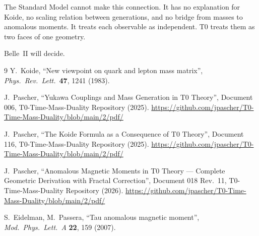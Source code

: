 The Standard Model cannot make this connection. It has no explanation for Koide, no scaling relation between generations, and no bridge from masses to anomalous moments. It treats each observable as independent. T0 treats them as two faces of one geometry.

Belle~II will decide.

\begin{thebibliography}{9}
	 Y.~Koide, ``New viewpoint on quark and lepton mass matrix'', 
	\textit{Phys.\ Rev.\ Lett.}\ \textbf{47}, 1241 (1983).
	
	 J.~Pascher, ``Yukawa Couplings and Mass Generation in T0 Theory'', 
	Document 006, T0-Time-Mass-Duality Repository (2025).
	\url{https://github.com/jpascher/T0-Time-Mass-Duality/blob/main/2/pdf/}
	
	 J.~Pascher, ``The Koide Formula as a Consequence of T0 Theory'', 
	Document 116, T0-Time-Mass-Duality Repository (2025).
	\url{https://github.com/jpascher/T0-Time-Mass-Duality/blob/main/2/pdf/}
	
	 J.~Pascher, ``Anomalous Magnetic Moments in T0 Theory --- Complete Geometric Derivation with Fractal Correction'', 
	Document 018 Rev.~11, T0-Time-Mass-Duality Repository (2026).
	\url{https://github.com/jpascher/T0-Time-Mass-Duality/blob/main/2/pdf/}
	
	 S.~Eidelman, M.~Passera, ``Tau anomalous magnetic moment'', 
	\textit{Mod.\ Phys.\ Lett.\ A} \textbf{22}, 159 (2007).
\end{thebibliography}
